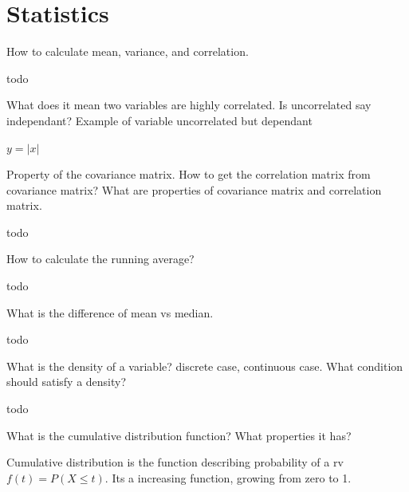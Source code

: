 \documentclass{exam}
\begin{document}
\newpage
\section{Statistics}
\begin{questions}

\question How to calculate mean, variance, and correlation.
\begin{solution}[.2in]
	todo
\end{solution}

\question What does it mean two variables are highly correlated. Is uncorrelated say independant? Example of variable uncorrelated but dependant
\begin{solution}[.2in]
	$y=|x|$
\end{solution}

\question Property of the covariance matrix. How to get the correlation matrix from covariance matrix? What are properties of covariance matrix and correlation matrix.
\begin{solution}[.2in]
	todo
\end{solution}

\question How to calculate the running average?
\begin{solution}[.2in]
	todo
\end{solution}

\question What is the difference of mean vs median.
\begin{solution}[.2in]
	todo
\end{solution}

\question What is the density of a variable? discrete case, continuous case. What condition should satisfy a density?
\begin{solution}[.2in]
	todo
\end{solution}

\question What is the cumulative distribution function? What properties it has?
\begin{solution}[.2in]
Cumulative distribution is the function describing probability of a rv $f(t) = P(X\leq t)$. Its a increasing function, growing from zero to 1.
\end{solution}


\end{questions}
\end{document}
